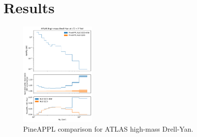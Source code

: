 \section{Results}
\label{sec:results}

\begin{figure}
    \centering
    \includegraphics[width=0.33\textwidth]{figures/pineappl_ATLASZHIGHMASS49FB}
    \caption{PineAPPL comparison for ATLAS high-mass Drell-Yan.}
    \label{fig:atlaszhighmass49fb}
\end{figure}

